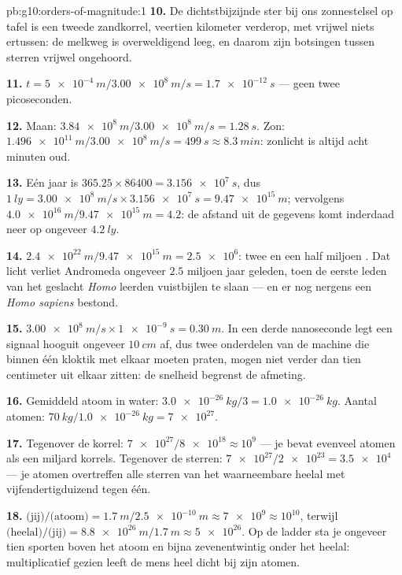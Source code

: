 \begin{solution}{pb:g10:orders-of-magnitude:1}
\textbf{10.} De dichtstbijzijnde ster bij ons zonnestelsel op tafel is
een tweede zandkorrel, veertien kilometer verderop, met vrijwel niets
ertussen: de melkweg is overweldigend leeg, en daarom zijn botsingen
tussen sterren vrijwel ongehoord.

\textbf{11.} $t = \qty{5e-4}{m}/\qty{3.00e8}{m/s} = \qty{1.7e-12}{s}$
--- geen twee picoseconden.

\textbf{12.} Maan: $\qty{3.84e8}{m}/\qty{3.00e8}{m/s} =
\qty{1.28}{s}$. Zon: $\qty{1.496e11}{m}/\qty{3.00e8}{m/s} =
\qty{499}{s} \approx \qty{8.3}{min}$: zonlicht is altijd acht minuten
oud.

\textbf{13.} Eén jaar is $365.25 \times 86400 = \qty{3.156e7}{s}$, dus
$\qty{1}{ly} = \qty{3.00e8}{m/s} \times \qty{3.156e7}{s}
= \qty{9.47e15}{m}$; vervolgens
$\qty{4.0e16}{m}/\qty{9.47e15}{m} = 4.2$: de afstand uit de gegevens
komt inderdaad neer op ongeveer $\qty{4.2}{ly}$.

\textbf{14.} $\qty{2.4e22}{m}/\qty{9.47e15}{m} = \num{2.5e6}$: twee en
een half miljoen . Dat licht verliet Andromeda ongeveer $2.5$
miljoen jaar geleden, toen de eerste leden van het geslacht
\emph{Homo} leerden vuistbijlen te slaan --- en er nog nergens een
\emph{Homo sapiens} bestond.

\textbf{15.} $\qty{3.00e8}{m/s} \times \qty{1e-9}{s} = \qty{0.30}{m}$.
In een derde nanoseconde legt een signaal hooguit ongeveer
$\qty{10}{cm}$ af, dus twee onderdelen van de machine die binnen één
kloktik met elkaar moeten praten, mogen niet verder dan tien centimeter
uit elkaar zitten: de snelheid begrenst de afmeting.

\textbf{16.} Gemiddeld atoom in water:
$\qty{3.0e-26}{kg}/3 = \qty{1.0e-26}{kg}$. Aantal atomen:
$\qty{70}{kg}/\qty{1.0e-26}{kg} = \num{7e27}$.

\textbf{17.} Tegenover de korrel:
$\num{7e27}/\num{8e18} \approx 10^{9}$ --- je bevat evenveel atomen
als een miljard korrels. Tegenover de sterren:
$\num{7e27}/\num{2e23} = \num{3.5e4}$ --- je atomen overtreffen alle
sterren van het waarneembare heelal met vijfendertigduizend tegen één.

\textbf{18.} $\text{(jij)}/\text{(atoom)} =
\qty{1.7}{m}/\qty{2.5e-10}{m} \approx \num{7e9} \approx 10^{10}$,
terwijl $\text{(heelal)}/\text{(jij)} =
\qty{8.8e26}{m}/\qty{1.7}{m} \approx \num{5e26}$. Op de ladder sta je
ongeveer tien sporten boven het atoom en bijna zevenentwintig onder
het heelal: multiplicatief gezien leeft de mens heel dicht bij zijn
atomen.


\end{solution}
